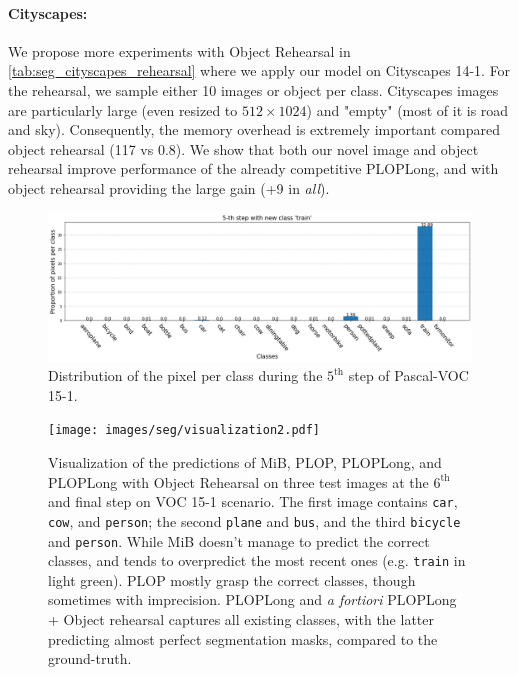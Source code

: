 \paragraph{Cityscapes:\,} We propose more experiments with Object Rehearsal in
\autoref{tab:seg_cityscapes_rehearsal} where we apply our model on Cityscapes 14-1. For the rehearsal,
we sample either 10 images or object per class. Cityscapes images are particularly large (even
resized to $512 \times 1024$)  and "empty" (most of it is road and sky). Consequently, the memory
overhead is extremely important compared object rehearsal (117 vs 0.8). We show that both our novel
image and object rehearsal improve performance of the already competitive PLOPLong, and with object
rehearsal providing the large gain (+9 \pp in \textit{all}).




\begin{figure}
    \centering
    \includegraphics[width=\linewidth]{images/seg/distribution_5step_voc.png}
    \vspace*{-0.3cm}
    \caption{Distribution of the pixel per class during the $5^{\text{th}}$ step of Pascal-VOC
        15-1.}
    \label{fig:seg_distribution_voc_5th}
\end{figure}

\begin{figure}
    \centering
    \texttt{[image: images/seg/visualization2.pdf]}
    \caption{Visualization of the predictions of MiB, PLOP, PLOPLong, and PLOPLong with Object
        Rehearsal on three test images at the $6^\text{th}$ and final step on VOC 15-1 scenario. The
        first image contains \texttt{car}, \texttt{cow}, and \texttt{person}; the second
        \texttt{plane} and \texttt{bus}, and the third \texttt{bicycle} and \texttt{person}. While
        MiB doesn't manage to predict the correct classes, and tends to overpredict the most recent
        ones (e.g. \texttt{train} in light green). PLOP mostly grasp the correct classes, though
        sometimes with imprecision. PLOPLong and \textit{a fortiori} PLOPLong + Object rehearsal
        captures all existing classes, with the latter predicting almost perfect segmentation masks,
        compared to the ground-truth.}
    \label{fig:seg_visualization}
\end{figure}

